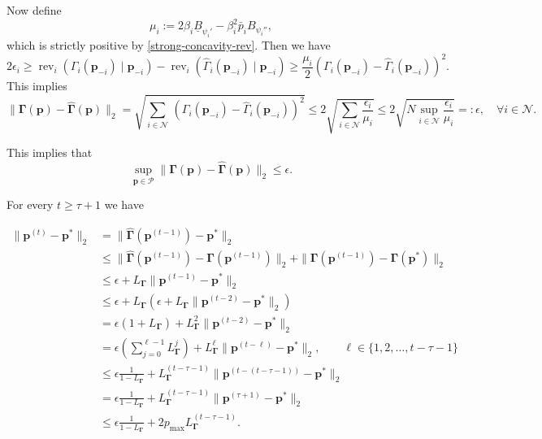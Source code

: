 \documentclass{article} %
\begin{document}
Now define 
$$
\mu_i := 2\beta_i \underline{B}_{\psi_i'}-\beta_i^2\bar{p}_iB_{\psi_i''},
$$
which is strictly positive by \cref{strong-concavity-rev}. Then we have 
$$
2\epsilon_i \geq \operatorname{rev}_i(\Gamma_i(\mathbf{p}_{-i}) \mid \mathbf{p}_{-i})-\operatorname{rev}_i(\widehat{\Gamma}_i(\mathbf{p}_{-i}) \mid \mathbf{p}_{-i})\geq \frac{\mu_i}{2} (\Gamma_i(\mathbf{p}_{-i})-\widehat{\Gamma}_i(\mathbf{p}_{-i}) )^{2}.
$$
This implies 
$$
\|\boldsymbol{\Gamma}(\mathbf{p})-\widehat{\boldsymbol{\Gamma}}(\mathbf{p}) \|_2=\sqrt{\sum_{i \in \mathcal{N}} \,(\Gamma_i(\mathbf{p}_{-i})-\widehat{\Gamma}_i(\mathbf{p}_{-i}) )^2}\leq 2\sqrt{ \sum_{i \in \mathcal{N}}\frac{\epsilon_i}{\mu_i}} \leq 2 \sqrt{N \sup_{i \in \mathcal{N}} \frac{\epsilon_i}{\mu_i}}=:\epsilon, \quad \forall i \in \mathcal{N}.
$$

This implies that 
$$
\sup_{\mathbf{p} \in \mathcal{P}}\|\boldsymbol{\Gamma}(\mathbf{p})-\widehat{\boldsymbol{\Gamma}}(\mathbf{p}) \|_2\leq \epsilon.
$$

For every $t \geq \tau+1$ we have

\begin{align}\label{ineq:NE_contraction_and_estim_error}
\|\mathbf{p}^{(t)}-\mathbf{p}^*\|_2 &= \|\widehat{\boldsymbol{\Gamma}}(\mathbf{p}^{(t-1)})-\mathbf{p}^*\|_2\nonumber\\
&\leq \|\widehat{\boldsymbol{\Gamma}}(\mathbf{p}^{(t-1)})-\boldsymbol{\Gamma}(\mathbf{p}^{(t-1)})\|_2+\|\boldsymbol{\Gamma}(\mathbf{p}^{(t-1)})-\boldsymbol{\Gamma}(\mathbf{p}^*)\|_2 \nonumber\\
&\leq \epsilon +L_{\boldsymbol{\Gamma}}\|\mathbf{p}^{(t-1)}-\mathbf{p}^*\|_2 \nonumber\\
&\leq \epsilon+L_{\boldsymbol{\Gamma}}(\epsilon+L_{\boldsymbol{\Gamma}}\|\mathbf{p}^{(t-2)}-\mathbf{p}^*\|_2) \nonumber\\
&= \epsilon (1+L_{\boldsymbol{\Gamma}})+L^2_{\boldsymbol{\Gamma}}\|\mathbf{p}^{(t-2)}-\mathbf{p}^*\|_2 \nonumber\\
&= \epsilon \left(\sum_{j=0}^{\ell-1}L^{j}_{\boldsymbol{\Gamma}}\right)+L^{\ell}_{\boldsymbol{\Gamma}}\|\mathbf{p}^{(t-\ell)}-\mathbf{p}^*\|_2, \qquad \ell \in \{1,2,\dots, t-\tau-1\} \nonumber\\
&\leq \epsilon \tfrac{1}{1-L_{\boldsymbol{\Gamma}}}+L^{(t-\tau-1)}_{\boldsymbol{\Gamma}}\|\mathbf{p}^{(t-(t-\tau-1))}-\mathbf{p}^*\|_2 \nonumber\\
&= \epsilon \tfrac{1}{1-L_{\boldsymbol{\Gamma}}}+L^{(t-\tau-1)}_{\boldsymbol{\Gamma}}\|\mathbf{p}^{(\tau+1)}-\mathbf{p}^*\|_2 \nonumber\\
&\leq \epsilon \tfrac{1}{1-L_{\boldsymbol{\Gamma}}}+2p_{\max} L^{(t-\tau-1)}_{\boldsymbol{\Gamma}}.
\end{align}
\end{document}

